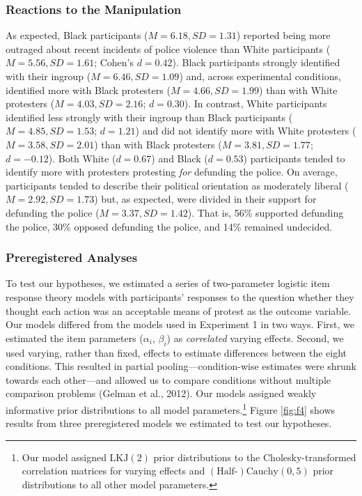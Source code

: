 \documentclass[twocolumn, 11pt, letterpaper]{article}
\begin{document}
\hypertarget{reactions-to-the-manipulation-1}{%
\subsubsection{Reactions to the
Manipulation}\label{reactions-to-the-manipulation-1}}

As expected, Black participants (\(M = 6.18, \textit{SD} = 1.31\))
reported being more outraged about recent incidents of police violence
than White participants (\(M = 5.56, \textit{SD} = 1.61\); Cohen's
\(d = 0.42\)). Black participants strongly identified with their ingroup
(\(M = 6.46, \textit{SD} = 1.09\)) and, across experimental conditions,
identified more with Black protesters (\(M = 4.66, \textit{SD} = 1.99\))
than with White protesters (\(M = 4.03, \textit{SD} = 2.16\);
\(d = 0.30\)). In contrast, White participants identified less strongly
with their ingroup than Black participants
(\(M = 4.85, \textit{SD} = 1.53\); \(d = 1.21\)) and did not identify
more with White protesters (\(M = 3.58, \textit{SD} = 2.01\)) than with
Black protesters (\(M = 3.81, \textit{SD} = 1.77\); \(d = -0.12\)). Both
White (\(d = 0.67\)) and Black (\(d = 0.53\)) participants tended to
identify more with protesters protesting \emph{for} defunding the
police. On average, participants tended to describe their political
orientation as moderately liberal (\(M = 2.92, \textit{SD} = 1.73\))
but, as expected, were divided in their support for defunding the police
(\(M = 3.37, \textit{SD} = 1.42\)). That is, 56\% supported defunding
the police, 30\% opposed defunding the police, and 14\% remained
undecided.

\hypertarget{preregistered-analyses-1}{%
\subsubsection{Preregistered Analyses}\label{preregistered-analyses-1}}

To test our hypotheses, we estimated a series of two-parameter logistic
item response theory models with participants' responses to the question
whether they thought each action was an acceptable means of protest as
the outcome variable. Our models differed from the models used in
Experiment 1 in two ways. First, we estimated the item parameters
(\(\alpha_i\), \(\beta_i\)) as \emph{correlated} varying effects.
Second, we used varying, rather than fixed, effects to estimate
differences between the eight conditions. This resulted in partial
pooling---condition-wise estimates were shrunk towards each other---and
allowed us to compare conditions without multiple comparison problems
(Gelman et al., 2012). Our models assigned weakly informative prior
distributions to all model parameters.\footnote{Our model assigned
  \(\text{LKJ} (2)\) prior distributions to the Cholesky-transformed
  correlation matrices for varying effects and
  \((\text{Half-})\text{Cauchy} (0, 5)\) prior distributions to all
  other model parameters.} Figure \ref{fig:f4} shows results from three
preregistered models we estimated to test our hypotheses.
\end{document}
